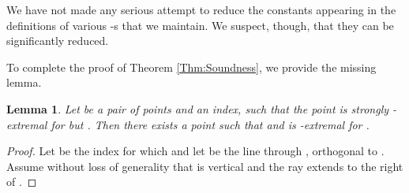 \documentclass[letter,11pt]{article}
\newtheorem{lemma}[theorem]{Lemma}
\begin{document}
 We have not made any serious attempt to reduce the constants  appearing in the definitions of various -s that we maintain. We suspect, though, that they can be significantly reduced.

To complete the proof of Theorem \ref{Thm:Soundness}, we provide the missing lemma.


\begin{lemma}\label{Lemma:qExtremal}
Let  be a pair of points and  an index,
such that the point  is strongly -extremal for  but
.
Then there exists a point  such that  and
  is -extremal
for  .
\end{lemma}

\begin{proof}

Let  be the index for which  and let
 be the 
line through , orthogonal to .
Assume without loss of generality that  is vertical and
the ray  extends to the right of .



\end{proof}
\end{document}

